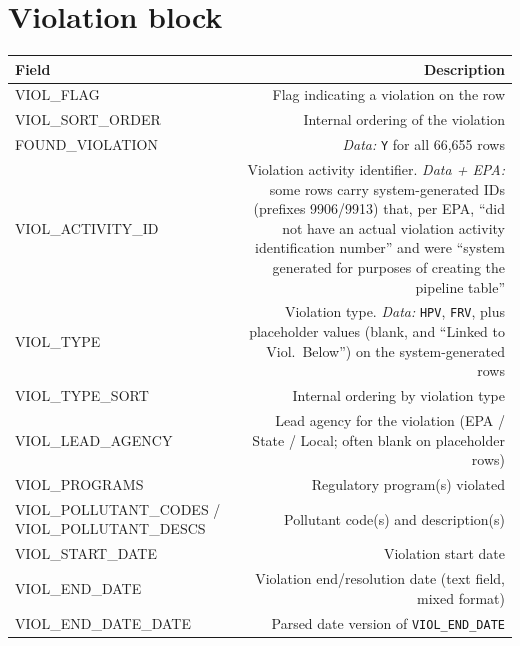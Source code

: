 \documentclass[11pt]{article}
\begin{document}
\section*{Violation block}
\begin{longtable}{F D}
\toprule
Field & Description \\ \midrule \endhead
VIOL\_FLAG & Flag indicating a violation on the row \\
VIOL\_SORT\_ORDER & Internal ordering of the violation \\
FOUND\_VIOLATION & \emph{Data:} \texttt{Y} for all 66,655 rows \\
VIOL\_ACTIVITY\_ID & Violation activity identifier. \emph{Data + EPA:} some rows carry system-generated
IDs (prefixes 9906/9913) that, per EPA, ``did not have an actual violation activity identification
number'' and were ``system generated for purposes of creating the pipeline table'' \\
VIOL\_TYPE & Violation type. \emph{Data:} \texttt{HPV}, \texttt{FRV}, plus placeholder values (blank, and
``Linked to Viol.\ Below'') on the system-generated rows \\
VIOL\_TYPE\_SORT & Internal ordering by violation type \\
VIOL\_LEAD\_AGENCY & Lead agency for the violation (EPA / State / Local; often blank on placeholder rows) \\
VIOL\_PROGRAMS & Regulatory program(s) violated \\
VIOL\_POLLUTANT\_CODES / VIOL\_POLLUTANT\_DESCS & Pollutant code(s) and description(s) \\
VIOL\_START\_DATE & Violation start date \\
VIOL\_END\_DATE & Violation end/resolution date (text field, mixed format) \\
VIOL\_END\_DATE\_DATE & Parsed date version of \texttt{VIOL\_END\_DATE} \\
\bottomrule
\end{longtable}
\end{document}
